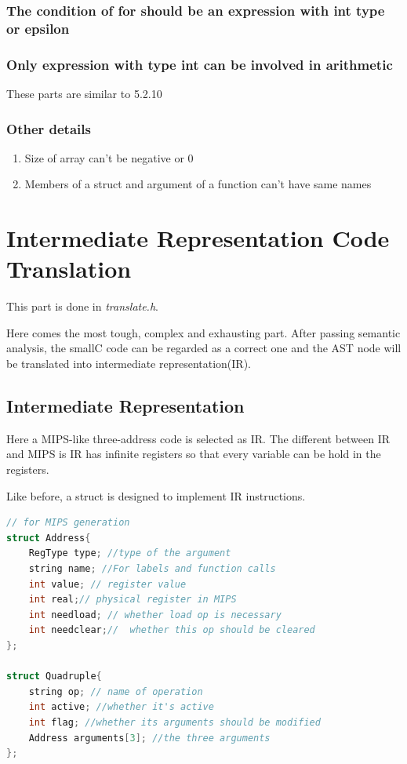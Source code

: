 \documentclass{article}
\begin{document}
\subsubsection{The condition of for should be an expression with int type or epsilon}

\subsubsection{Only expression with type int can be involved in arithmetic}
These parts are similar to 5.2.10

\subsubsection{Other details}
\begin{enumerate}
\item
Size of array can’t be negative or 0
\item
Members of a struct and argument of a function can’t have same names
\end{enumerate}



\section{Intermediate Representation Code Translation}

This part is done in \textit{translate.h}. 

Here comes the most tough, complex and exhausting part. 
After passing semantic analysis, the smallC code can be regarded as a correct one and the AST node will be translated into intermediate representation(IR).


\subsection{Intermediate Representation}
Here a MIPS-like three-address code is selected as IR. The different between IR and MIPS is IR has infinite registers so that every variable can be hold in the registers. 

Like before, a struct is designed to implement IR instructions.

\begin{lstlisting}[language = C] 
// for MIPS generation
struct Address{
    RegType type; //type of the argument
    string name; //For labels and function calls
    int value; // register value
    int real;// physical register in MIPS
    int needload; // whether load op is necessary
    int needclear;//  whether this op should be cleared
};

struct Quadruple{
    string op; // name of operation
    int active; //whether it's active
    int flag; //whether its arguments should be modified
    Address arguments[3]; //the three arguments 
};
\end{lstlisting}
\end{document}
